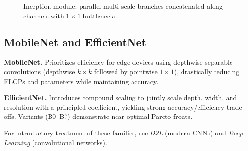 \begin{figure}[h]
    \centering
    \caption{Inception module: parallel multi-scale branches concatenated along channels with $1\times1$ bottlenecks.}
    \label{fig:inception-module}
\end{figure}

\subsection{MobileNet and EfficientNet}

\textbf{MobileNet.} Prioritizes efficiency for edge devices using depthwise separable convolutions (depthwise $k\times k$ followed by pointwise $1\times1$), drastically reducing FLOPs and parameters while maintaining accuracy.

\textbf{EfficientNet.} Introduces compound scaling to jointly scale depth, width, and resolution with a principled coefficient, yielding strong accuracy/efficiency trade-offs. Variants (B0--B7) demonstrate near-optimal Pareto fronts.

For introductory treatment of these families, see \textit{D2L} \href{https://d2l.ai/chapter_convolutional-modern/index.html}{(modern CNNs)} and \textit{Deep Learning} \href{https://www.deeplearningbook.org/contents/convnets.html}{(convolutional networks)}.

